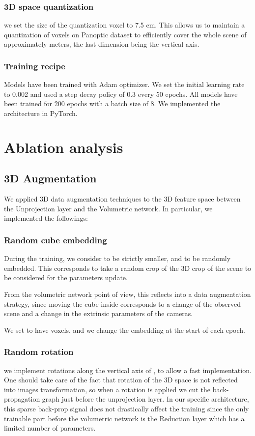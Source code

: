 \documentclass[a4paper,conference]{IEEEtran}
\begin{document}
\subsubsection{3D space quantization} we set the size of the quantization voxel to 7.5 cm. This allows us to maintain a quantization of  voxels on Panoptic dataset to efficiently cover the whole scene of approximately  meters, the last dimension being the vertical axis.
\subsubsection{Training recipe}
Models have been trained with Adam optimizer. We set the initial learning rate to 0.002 and used a step decay policy of 0.3 every 50 epochs. All models have been trained for 200 epochs with a batch size of 8. We implemented the architecture in PyTorch.
\section{Ablation analysis}\label{sec:ablation}

\subsection{3D Augmentation}
We applied 3D data augmentation techniques to the 3D feature space between the Unprojection layer and the Volumetric network. In particular, we implemented the followings:

\subsubsection{Random cube embedding} 
During the training, we consider  to be 
strictly smaller, and to be randomly embedded. This corresponds
to take a random crop of the 3D crop of the scene to
be considered for the parameters update.

From the volumetric network point of view, this reflects into a data 
augmentation strategy, since moving the cube inside  corresponds 
to a change of the observed scene and a change 
in the extrinsic parameters of the cameras.

We set  to have  voxels,
and we change the embedding at the start of each epoch.


\subsubsection{Random rotation} we implement rotations along the vertical axis of , to allow a fast implementation. One should take care of the fact that rotation of the 3D space is not reflected into images transformation, so when a rotation is applied we cut the back-propagation graph just before the unprojection layer. In our specific architecture, this sparse back-prop signal does not drastically affect the training since the only trainable part before the volumetric network is the Reduction layer which has a limited number of parameters.
\end{document}
